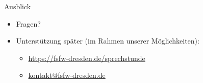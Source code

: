 \documentclass{beamer}
\begin{document}
\begin{frame}[label=uj]{Ausblick}
\begin{itemize}
 \item Fragen?\\[10mm]
   \pause
 \item Unterstützung später {\tiny (im Rahmen unserer Möglichkeiten)}:
   \begin{itemize}
   \item \url{https://fsfw-dresden.de/sprechstunde}
   \item \url{kontakt@fsfw-dresden.de}
   \end{itemize}
\end{itemize}



\end{frame}

\end{document}
